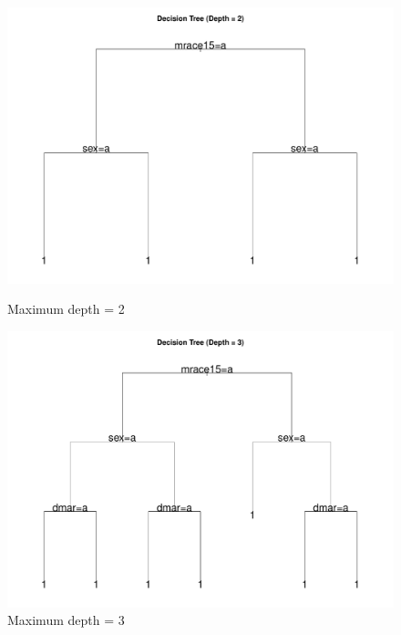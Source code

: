 \begin{figure}[p]
    \centering
    \begin{minipage}{0.48\textwidth}
        \centering
        \includegraphics[width=\linewidth]{chapters/chapter3/figures/depth/plot1/decision_tree_depth_2_2021_large.pdf}
        \caption*{Maximum depth = 2}
    \end{minipage}
    \hspace{0.02\textwidth}
    \begin{minipage}{0.48\textwidth}
        \centering
        \includegraphics[width=\linewidth]{chapters/chapter3/figures/depth/plot1/decision_tree_depth_3_2021_large.pdf}
        \caption*{Maximum depth = 3}
    \end{minipage}
    

\end{figure}
